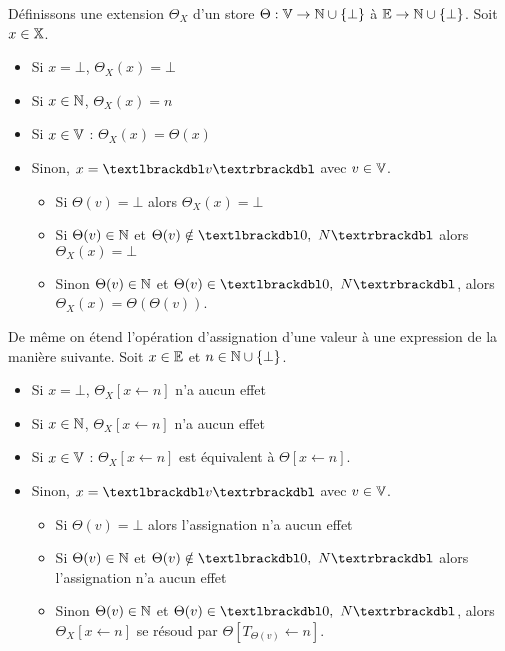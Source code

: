 \begin{defi}
 Définissons une extension $\Theta_X$ d'un store $\Theta : \mathbb V\rightarrow\mathbb N\cup\{\bot\}$ à $\mathbb E\rightarrow\mathbb N\cup\{\bot\}$. Soit $x\in\mathbb X$.
 \begin{itemize}
  \item Si $x=\bot$, $\Theta_X(x)=\bot$
  \item Si $x\in\mathbb N$, $\Theta_X(x)=n$
  \item Si $x\in\mathbb V$ : $\Theta_X(x)=\Theta(x)$
  \item Sinon, $x=\textlbrackdbl v\textrbrackdbl$ avec $v\in\mathbb V$.
  \begin{itemize}
   \item Si $\Theta(v)=\bot$ alors $\Theta_X(x)=\bot$
   \item Si $\Theta(v)\in\mathbb N$ et $\Theta(v)\notin\textlbrackdbl 0,\ N\textrbrackdbl$ alors $\Theta_X(x)=\bot$
   \item Sinon $\Theta(v)\in\mathbb N$ et $\Theta(v)\in\textlbrackdbl 0,\ N\textrbrackdbl$, alors $\Theta_X(x)=\Theta(\Theta(v))$.
  \end{itemize}
 \end{itemize}
  De même on étend l'opération d'assignation d'une valeur à une expression de la manière suivante. Soit $x\in\mathbb E$ et $n\in\mathbb N\cup\{\bot\}$.
  \begin{itemize}
  \item Si $x=\bot$, $\Theta_X[x\leftarrow n]$ n'a aucun effet
  \item Si $x\in\mathbb N$, $\Theta_X[x\leftarrow n]$ n'a aucun effet
  \item Si $x\in\mathbb V$ : $\Theta_X[x\leftarrow n]$ est équivalent à $\Theta[x\leftarrow n]$.
  \item Sinon, $x=\textlbrackdbl v\textrbrackdbl$ avec $v\in\mathbb V$.
    \begin{itemize}
   \item Si $\Theta(v)=\bot$ alors l'assignation n'a aucun effet
   \item Si $\Theta(v)\in\mathbb N$ et $\Theta(v)\notin\textlbrackdbl 0,\ N\textrbrackdbl$ alors l'assignation n'a aucun effet
   \item Sinon $\Theta(v)\in\mathbb N$ et $\Theta(v)\in\textlbrackdbl 0,\ N\textrbrackdbl$, alors $\Theta_X[x\leftarrow n]$ se résoud par $\Theta[T_{\Theta(v)}\leftarrow n]$.
  \end{itemize}
  \end{itemize}
\label{sem_store_dynamique_pointeurs}
\end{defi}

